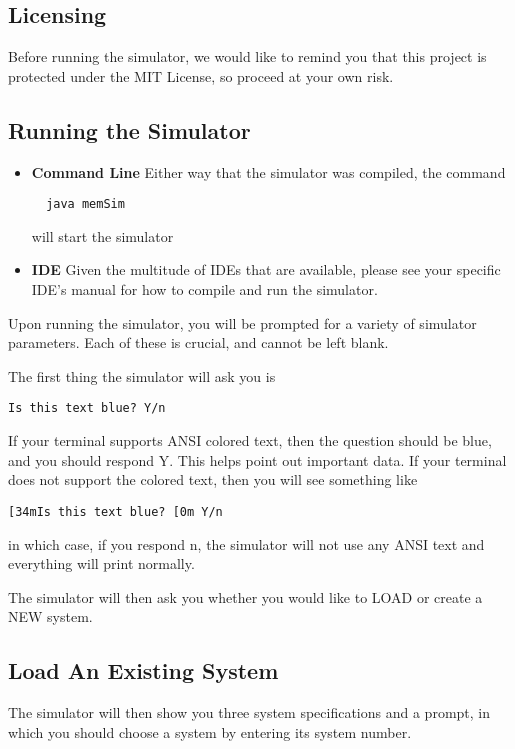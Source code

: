 \documentclass[12pt]{article}
\newcommand{\singlespace}{
  \protect\renewcommand\baselinestretch{1.0}
  \protect\normalsize
}
\begin{document}
\subsection{Licensing}
Before running the simulator, we would like to remind you that this
project is protected under the MIT License, so proceed at your own risk.

\subsection{Running the Simulator}
\begin{itemize}
\item \textbf{Command Line}
  Either way that the simulator was compiled, the command
{\singlespace
\begin{verbatim}
  java memSim
\end{verbatim}
}
  will start the simulator
\item \textbf{IDE}
  Given the multitude of IDEs that are available, please see your
  specific IDE's manual for how to compile and run the simulator.
\end{itemize}
Upon running the simulator, you will be prompted for a variety of 
simulator parameters. Each of these is crucial, and cannot be left blank.

The first thing the simulator will ask you is
{\singlespace
\begin{verbatim}
Is this text blue? Y/n
\end{verbatim}
}
If your terminal supports ANSI colored text, then the question should be blue,
and you should respond Y. This helps point out important data.
If your terminal does not support the colored text, then you will see something like

\begin{verbatim}
[34mIs this text blue? [0m Y/n
\end{verbatim}
in which case, if you respond n, the simulator will not use any ANSI text and
everything will print normally.

The simulator will then ask you whether you would like to LOAD or create a NEW system.

\subsection*{Load An Existing System}
The simulator will then show you three system specifications and a prompt, in which
you should choose a system by entering its system number.
\end{document}
